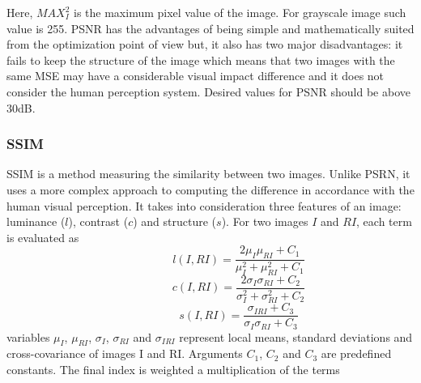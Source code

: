 Here, $MAX_{I}^{2}$ is the maximum pixel value of the image. For grayscale image such value is 255. PSNR has the advantages of being simple and mathematically suited from the optimization point of view but, it also has two major disadvantages: it fails to keep the structure of the image which means that two images with the same MSE may have a considerable visual impact difference and it does not consider the human perception system. Desired values for PSNR should be above 30dB. 

\subsubsection{SSIM}
SSIM is a method measuring the similarity between two images. Unlike PSRN, it uses a more complex approach to computing the difference in accordance with the human visual perception. It takes into consideration three features of an image: luminance ($l$), contrast ($c$) and structure ($s$). For two images $I$ and $RI$, each term is evaluated as
\begin{equation} \label{eq:Lumi}
\hspace{3em} \hspace{3em} \hspace{3em} l(I,RI)= \frac{2\mu_{I} \mu_{RI} + C_1}{\mu_{I}^2 + \mu_{RI}^2 + C_1} \enspace \enspace \hspace{3em}
\end{equation}
\begin{equation} \label{eq:contra}
\hspace{3em} \hspace{3em} \hspace{3em} c(I,RI)= \frac{2\sigma_{I} \sigma_{RI} + C_2}{\sigma_{I}^2 + \sigma_{RI}^2 + C_2} \enspace \enspace \hspace{3em}
\end{equation}
\begin{equation} \label{eq:Struct}
\hspace{3em} \hspace{3em} \hspace{3em} s(I,RI)= \frac{\sigma_{IRI} + C_3}{\sigma_{I} \sigma_{RI} + C_3} \enspace \enspace \hspace{3em}
\end{equation}
variables $\mu_{I}$, $\mu_{RI}$, $\sigma_{I}$, $\sigma_{RI}$ and $\sigma_{IRI}$ represent local means, standard deviations and cross-covariance of images I and RI. Arguments $C_1$, $C_2$ and $C_3$ are predefined constants. The final index is weighted a multiplication of the terms

